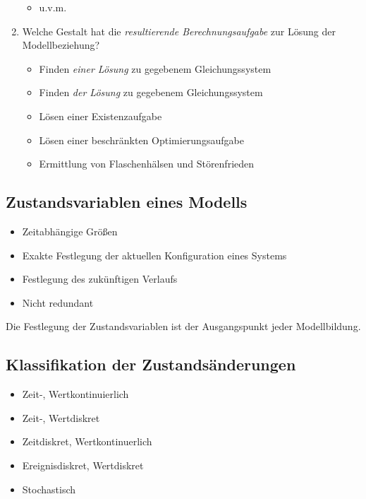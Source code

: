 \begin{enumerate}
\begin{itemize}
                		\item u.v.m.
                	\end{itemize}
            	\item Welche Gestalt hat die \textit{resultierende Berechnungsaufgabe} zur Lösung der Modellbeziehung?
                	\begin{itemize}
                		\item Finden \textit{einer Lösung} zu gegebenem Gleichungssystem
                		\item Finden \textit{der Lösung} zu gegebenem Gleichungssystem
                		\item Lösen einer Existenzaufgabe
                		\item Lösen einer beschränkten Optimierungsaufgabe
                		\item Ermittlung von Flaschenhälsen und Störenfrieden
                	\end{itemize}
            \end{enumerate}

        \subsection{Zustandsvariablen eines Modells} %
            \begin{itemize}
            	\item Zeitabhängige Größen
            	\item Exakte Festlegung der aktuellen Konfiguration eines Systems
            	\item Festlegung des zukünftigen Verlaufs
            	\item Nicht redundant
            \end{itemize}
            Die Festlegung der Zustandsvariablen ist der Ausgangspunkt jeder Modellbildung.

        \subsection{Klassifikation der Zustandsänderungen} %
            \begin{itemize}
            	\item Zeit-, Wertkontinuierlich
            	\item Zeit-, Wertdiskret
            	\item Zeitdiskret, Wertkontinuerlich
            	\item Ereignisdiskret, Wertdiskret
            	\item Stochastisch
            \end{itemize}
            
